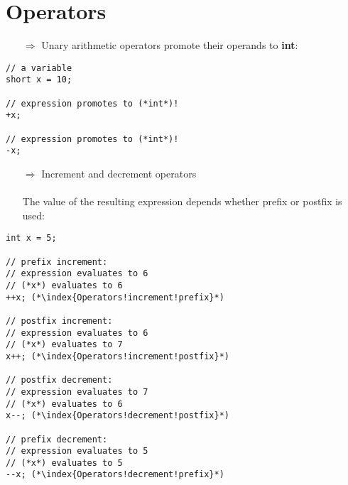 \documentclass[10pt]{article}
\begin{document}
\section{Operators}
\small
\begin{enumerate}
\item[$\Rightarrow$] Unary arithmetic operators promote their operands to \textbf{int}:
\end{enumerate}
\begin{lstlisting}
// a variable
short x = 10;

// expression promotes to (*int*)!
+x;

// expression promotes to (*int*)!
-x;
\end{lstlisting}
\begin{enumerate}
\item[$\Rightarrow$] Increment and decrement operators\\ \\ The value of the resulting expression depends whether prefix or postfix is used:
\end{enumerate}
\begin{lstlisting}
int x = 5;

// prefix increment:
// expression evaluates to 6
// (*x*) evaluates to 6
++x; (*\index{Operators!increment!prefix}*)

// postfix increment:
// expression evaluates to 6
// (*x*) evaluates to 7
x++; (*\index{Operators!increment!postfix}*)

// postfix decrement:
// expression evaluates to 7
// (*x*) evaluates to 6
x--; (*\index{Operators!decrement!postfix}*)

// prefix decrement:
// expression evaluates to 5
// (*x*) evaluates to 5
--x; (*\index{Operators!decrement!prefix}*)
\end{lstlisting}
%
%
\end{document}
